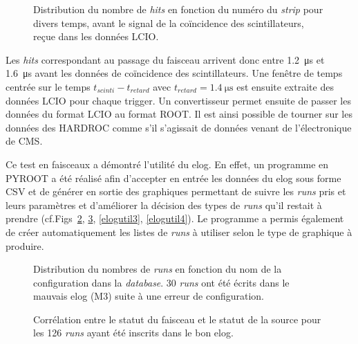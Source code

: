 \begin{figure}[ht!]
	\hfill
	\caption{Distribution du nombre de \textit{hits} en fonction du numéro du \textit{strip} pour divers temps, avant le signal de la coïncidence des scintillateurs, reçue dans les données LCIO.}
	\label{decalage}
\end{figure}  

Les \textit{hits} correspondant au passage du faisceau arrivent donc entre  \SI{1.2}{\micro\second} et \SI{1.6}{\micro\second} avant les données de coïncidence des scintillateurs. Une fenêtre de temps centrée sur le temps $t_{scinti}-t_{retard}$ avec $t_{retard}=\SI{1.4}{\micro\second}$ est ensuite extraite des données LCIO pour chaque trigger. Un convertisseur permet ensuite de passer les données du format LCIO au format ROOT. Il est ainsi possible de tourner sur les données des HARDROC comme s'il s'agissait de données venant de l'électronique de CMS.

Ce test en faisceaux a démontré l'utilité du elog. En effet, un programme en PYROOT a été réalisé afin d'accepter en entrée les données du elog sous forme CSV et de générer en sortie des graphiques permettant de suivre les \textit{runs} pris et leurs paramètres et d'améliorer la décision des types de \textit{runs} qu'il restait à prendre (cf.Figs~\ref{elogutil1}, \ref{elogutil2}, \ref{elogutil3}, \ref{elogutil4}). Le programme a permis également de créer automatiquement les listes de \textit{runs} à utiliser selon le type de graphique à produire. 

\begin{figure}[ht!]
	\centering
	\caption{Distribution du nombres de \textit{runs} en fonction du nom de la configuration dans la \textit{database}. \num{30} \textit{runs} ont été écrits dans le mauvais elog (M3) suite à une erreur de configuration.}
	\label{elogutil1}	
\end{figure}

\begin{figure}[ht!]
	\centering
	\caption{Corrélation entre le statut du faisceau et le statut de la source pour les \num{126} \textit{runs} ayant été inscrits dans le bon elog.}
	\label{elogutil2}	
\end{figure}

